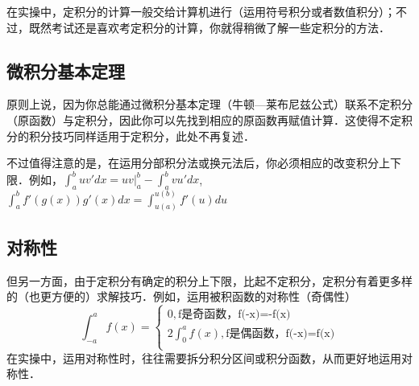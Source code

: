 
在实操中，定积分的计算一般交给计算机进行（运用符号积分或者数值积分）；不过，既然考试还是喜欢考定积分的计算，你就得稍微了解一些定积分的方法．

\subsection{微积分基本定理}
原则上说，因为你总能通过微积分基本定理（牛顿—莱布尼兹公式）联系不定积分（原函数）与定积分，因此你可以先找到相应的原函数再赋值计算．这使得不定积分的积分技巧同样适用于定积分，此处不再复述．

不过值得注意的是，在运用分部积分法或换元法后，你必须相应的改变积分上下限．例如，$\int^b_a uv'dx = uv|^b_a-\int^b_a vu'dx$, $\int^b_a f'(g(x))g'(x)dx = \int ^{u(b)}_{u(a)} f'(u)du$

\subsection{对称性}
但另一方面，由于定积分有确定的积分上下限，比起不定积分，定积分有着更多样的（也更方便的）求解技巧．例如，运用被积函数的对称性（奇偶性）
$$
\int ^a_{-a} f(x) = 
\left \{
\begin{aligned}
0,\text{f是奇函数，f(-x)=-f(x)}\\
2\int ^a_0 f(x),\text{f是偶函数，f(-x)=f(x)}\\
\end{aligned}
\right.
$$
在实操中，运用对称性时，往往需要拆分积分区间或积分函数，从而更好地运用对称性．
